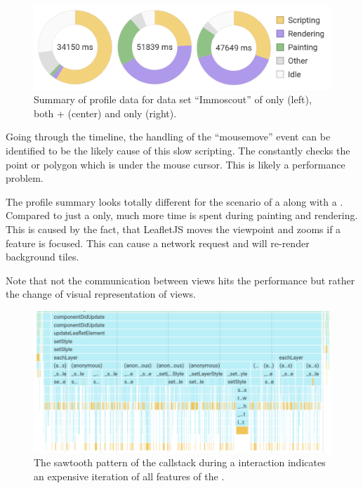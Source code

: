 \begin{figure}[ht]
  \centering
  \includegraphics[width=\textwidth]{figures/evaluation/performance/summaries/immoscout}
  \caption{
    Summary of profile data for data set ``Immoscout'' of \tmap{} only (left), both \tmap{} + \gv{} (center) and only \gv{} (right).
  }\label{fig:evaluation:performance:profiling:immoscout:summary}
\end{figure}

Going through the timeline, the handling of the ``mousemove'' event can be identified to be the likely cause of this slow scripting.
The \tmap{} constantly checks the point or polygon which is under the mouse cursor.
This is likely a performance problem.

The profile summary looks totally different for the scenario of a \tmap{} along with a \gvis{}.
Compared to just a \tmap{} only, much more time is spent during painting and rendering.
This is caused by the fact, that LeafletJS moves the viewpoint and zooms if a feature is focused.
This can cause a network request and will re-render background tiles.

Note that not the communication between views hits the performance but rather the change of visual representation of views.


\begin{figure}[ht]
  \centering
  \includegraphics[width=\textwidth]{figures/evaluation/performance/profiles/immoscout_geo_only/callstack}
  \caption{
    The sawtooth pattern of the callstack during a  interaction indicates an expensive iteration of all features of the .
  }\label{fig:evaluation:performance:profiling:immoscout_both:callstack}
\end{figure}


